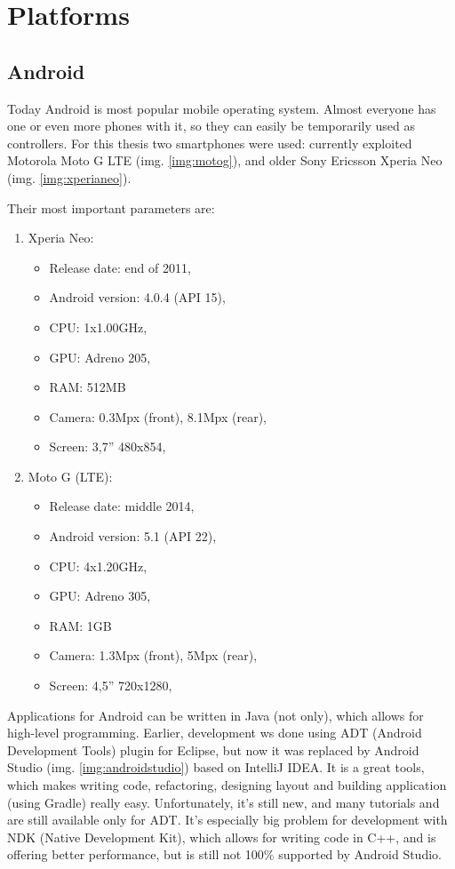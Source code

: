 \chapter{Platforms}

\section{Android}
Today Android is most popular mobile operating system.
Almost everyone has one or even more phones with it, so they can easily be
temporarily used as controllers.
For this thesis two smartphones were used: currently exploited Motorola Moto G
LTE (img. \ref{img:motog}), and older Sony Ericsson Xperia Neo (img.
\ref{img:xperianeo}).

Their most important parameters are:
\begin{enumerate}
  \item Xperia Neo:
  	\begin{itemize}
  	  \item Release date: end of 2011,
  	  \item Android version: 4.0.4 (API 15),
  	  \item CPU: 1x1.00GHz,
  	  \item GPU: Adreno 205,
  	  \item RAM: 512MB
  	  \item Camera: 0.3Mpx (front), 8.1Mpx (rear),
  	  \item Screen: 3,7'' 480x854,
  	\end{itemize}
  \item Moto G (LTE):
  	\begin{itemize}
  	  \item Release date: middle 2014,
  	  \item Android version: 5.1 (API 22),
  	  \item CPU: 4x1.20GHz,
  	  \item GPU: Adreno 305,
  	  \item RAM: 1GB
  	  \item Camera: 1.3Mpx (front), 5Mpx (rear),
  	  \item Screen: 4,5'' 720x1280,
  	\end{itemize}
\end{enumerate}

Applications for Android can be written in Java (not only), which allows for
high-level programming.
Earlier, development ws done using ADT (Android Development Tools) plugin for
Eclipse, but now it was replaced by Android Studio (img.
\ref{img:androidstudio}) based on IntelliJ IDEA.
It is a great tools, which makes writing code, refactoring, designing layout and
building application (using Gradle) really easy.
Unfortunately, it's still new, and many tutorials and are still available only
for ADT.
It's especially big problem for development with NDK (Native Development Kit),
which allows for writing code in C++, and is offering better performance, but is
still not 100\% supported by Android Studio.

